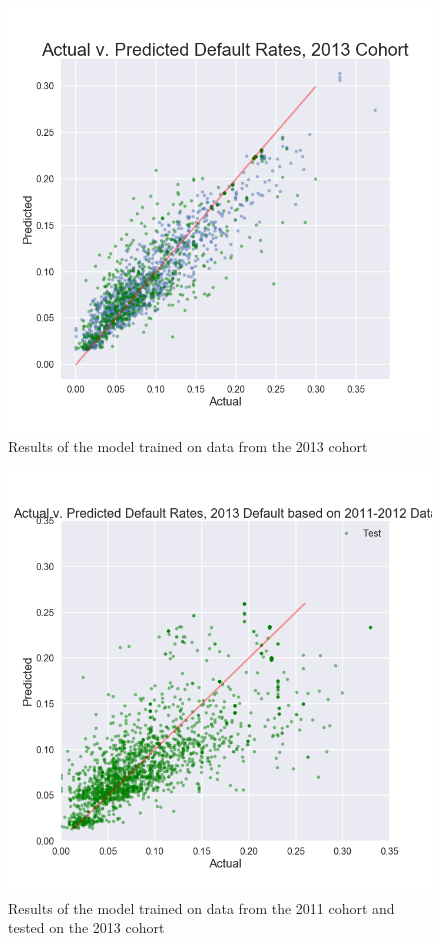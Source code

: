 \documentclass[10pt,twocolumn]{article}
\begin{document}
\begin{figure}[!t]
  \begin{center}
    \includegraphics[width=\textwidth]{results2013.png}
  \end{center}

  \caption{\Figure Results of the model trained on data from the 2013 cohort}
  \label{results2013}
\end{figure}

\begin{figure}[!t]
  \begin{center}
    \includegraphics[width=\textwidth]{2013from2011.png}
  \end{center}

  \caption{\Figure Results of the model trained on data from the 2011 cohort
  and tested on the 2013 cohort}
  \label{2013from2011}
\end{figure}
\end{document}
